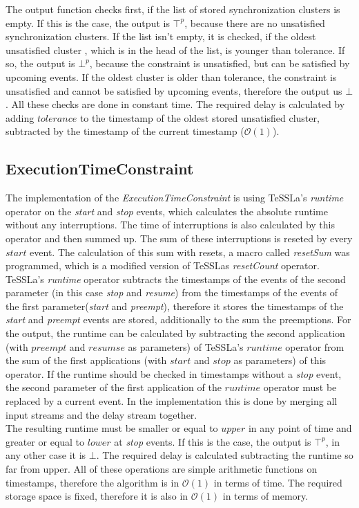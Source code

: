 	The output function checks first, if the list of stored synchronization clusters is empty. If this is the case, the output is $\top^p$, because there are no unsatisfied synchronization clusters. If the list isn't empty, it is checked, if the oldest unsatisfied cluster , which is in the head of the list, is younger than tolerance. If so, the output is $\bot^p$, because the constraint is unsatisfied, but can be satisfied by upcoming events. If the oldest cluster is older than tolerance, the constraint is unsatisfied and cannot be satisfied by upcoming events, therefore the output us $\bot$. All these checks are done in constant time. The required delay is calculated by adding $tolerance$ to the timestamp of the oldest stored unsatisfied cluster, subtracted by the timestamp of the current timestamp ($\mathcal{O}(1)$).
	
\subsection{ExecutionTimeConstraint}
	The implementation of the \emph{ExecutionTimeConstraint} is using TeSSLa's \emph{runtime} operator on the \emph{start} and \emph{stop} events, which calculates the absolute runtime without any interruptions. The time of interruptions is also calculated by this operator and then summed up. The sum of these interruptions is reseted by every $start$ event. The calculation of this sum with resets, a macro called \textit{resetSum} was programmed, which is a modified version of TeSSLas \textit{resetCount} operator.\\
	TeSSLa's \emph{runtime} operator subtracts the timestamps of the events of the second parameter (in this case \emph{stop} and \emph{resume}) from the timestamps of the events of the first parameter(\emph{start} and \emph{preempt}), therefore it stores the timestamps of the \emph{start} and \emph{preempt} events are stored, additionally to the sum the preemptions.
	For the output, the runtime can be calculated by subtracting the second application (with $preempt$ and $resumse$ as parameters) of TeSSLa's $runtime$ operator from the sum of the first applications (with $start$ and $stop$ as parameters) of this operator. If the runtime should be checked in timestamps without a \emph{stop} event, the second parameter of the first application of the $runtime$ operator must be replaced by a current event. In the implementation this is done by merging all input streams and the delay stream together.\\
	The resulting runtime must be smaller or equal to $upper$ in any point of time and greater or equal to $lower$ at \emph{stop} events. If this is the case, the output is $\top^p$, in any other case it is $\bot$. The required delay is calculated subtracting the runtime so far from upper. All of these operations are simple arithmetic functions on timestamps, therefore the algorithm is in $\mathcal{O}(1)$ in terms of time. The required storage space is fixed, therefore it is also in $\mathcal{O}(1)$ in terms of memory.

